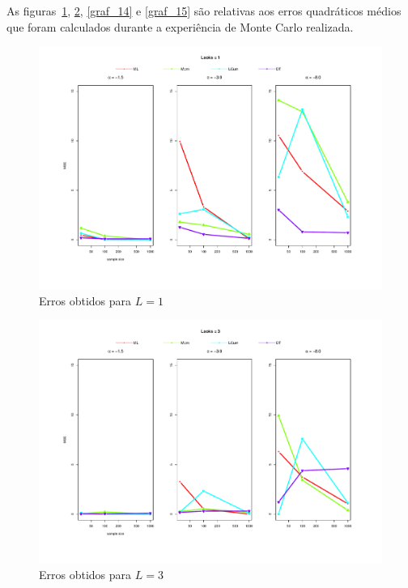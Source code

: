As figuras~\ref{graf_12}, \ref{graf_13}, \ref{graf_14} e \ref{graf_15} são relativas aos erros quadráticos médios que foram calculados durante a experiência de Monte Carlo realizada. 
\begin{figure}[H]
     \centering
     \includegraphics[scale=0.45]{plots/mse_L=1.pdf}
     \caption{Erros obtidos para $L=1$}
     \label{graf_12}
\end{figure}
\begin{figure}[H]
     \centering
     \includegraphics[scale=0.45]{plots/mse_L=3.pdf}
     \caption{Erros obtidos para $L=3$}
     \label{graf_13}
\end{figure}
